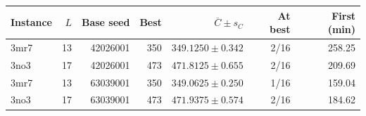 \begin{tabular}{@{}lrrrrrr@{}}
\toprule
Instance & $L$ & Base seed & Best & $\overline C\pm s_C$ & At best & First (min) \\
\midrule
3mr7 & 13 & 42026001 & 350 & $349.1250\pm0.342$ & 2/16 & 258.25 \\
3no3 & 17 & 42026001 & 473 & $471.8125\pm0.655$ & 2/16 & 209.69 \\
3mr7 & 13 & 63039001 & 350 & $349.0625\pm0.250$ & 1/16 & 159.04 \\
3no3 & 17 & 63039001 & 473 & $471.9375\pm0.574$ & 2/16 & 184.62 \\
\bottomrule
\end{tabular}
